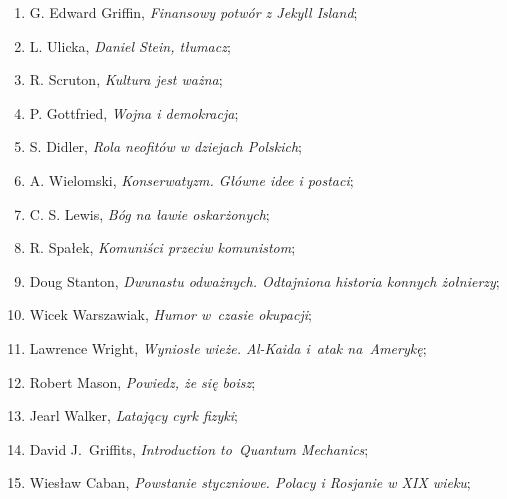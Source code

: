 \documentclass[a4paper,11pt]{article}
\begin{document}
\begin{enumerate}
\item G. Edward Griffin, \textit{Finansowy potwór z Jekyll Island};



\item L. Ulicka, \textit{Daniel Stein, tłumacz};



\item R. Scruton, \textit{Kultura jest ważna};



\item P. Gottfried, \textit{Wojna i demokracja};



\item S. Didler, \textit{Rola neofitów w dziejach Polskich};



\item A. Wielomski, \textit{Konserwatyzm. Główne idee i postaci};



\item C. S. Lewis, \textit{Bóg na ławie oskarżonych};



\item R. Spałek, \textit{Komuniści przeciw komunistom};



\item Doug Stanton, \textit{Dwunastu odważnych. Odtajniona historia
    konnych żołnierzy};



\item Wicek Warszawiak, \textit{Humor w~czasie okupacji};



\item Lawrence Wright, \textit{Wyniosłe wieże. Al-Kaida i~atak
    na~Amerykę};



\item Robert Mason, \textit{Powiedz, że się boisz};



\item Jearl Walker, \textit{Latający cyrk fizyki};



\item David J.~Griffits, \textit{Introduction to~Quantum Mechanics};



\item Wiesław Caban, \textit{Powstanie styczniowe. Polacy i Rosjanie w
    XIX wieku};




\end{enumerate}
\end{document}
